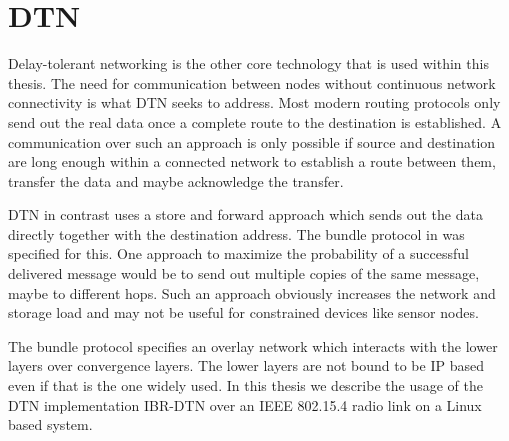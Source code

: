 \section{DTN}
\label{introdtn}
Delay-tolerant networking is the other core technology that is used within this
thesis. The need for communication between nodes without continuous network
connectivity is what DTN seeks to address. Most modern routing protocols only
send out the real data once a complete route to the destination is established.
A communication over such an approach is only possible if source and destination
are long enough within a connected network to establish a route between them,
transfer the data and maybe acknowledge the transfer.

DTN in contrast uses a store and forward approach which sends out the data
directly together with the destination address. The bundle protocol in
\cite{RFC5050} was specified for this. One approach to maximize the probability
of a successful delivered message would be to send out multiple copies of the
same message, maybe to different hops. Such an approach obviously increases the
network and storage load and may not be useful for constrained devices like
sensor nodes.

The bundle protocol specifies an overlay network which interacts with the lower
layers over convergence layers. The lower layers are not bound to be IP
based even if that is the one widely used. In this thesis we describe the usage
of the DTN implementation IBR-DTN over an IEEE 802.15.4 radio link on a Linux
based system.
